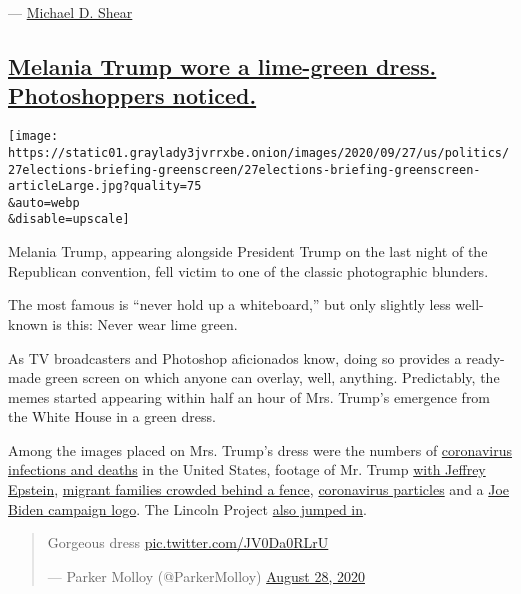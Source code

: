 --- \href{https://www.nytimes3xbfgragh.onion/by/michael-d-shear}{Michael
D. Shear}

\hypertarget{melania-trump-wore-a-lime-green-dress-photoshoppers-noticed}{%
\subsection{\texorpdfstring{\protect\hyperlink{melania-trump-wore-a-lime-green-dress-photoshoppers-noticed}{Melania
Trump wore a lime-green dress. Photoshoppers
noticed.}}{Melania Trump wore a lime-green dress. Photoshoppers noticed.}}\label{melania-trump-wore-a-lime-green-dress-photoshoppers-noticed}}

\texttt{[image: https://static01.graylady3jvrrxbe.onion/images/2020/09/27/us/politics/27elections-briefing-greenscreen/27elections-briefing-greenscreen-articleLarge.jpg?quality=75\\\&auto=webp\\\&disable=upscale]}

Melania Trump, appearing alongside President Trump on the last night of
the Republican convention, fell victim to one of the classic
photographic blunders.

The most famous is ``never hold up a whiteboard,'' but only slightly
less well-known is this: Never wear lime green.

As TV broadcasters and Photoshop aficionados know, doing so provides a
ready-made green screen on which anyone can overlay, well, anything.
Predictably, the memes started appearing within half an hour of Mrs.
Trump's emergence from the White House in a green dress.

Among the images placed on Mrs. Trump's dress were the numbers of
\href{https://twitter.com/ParkerMolloy/status/1299174942882365441}{coronavirus
infections and deaths} in the United States, footage of Mr. Trump
\href{https://twitter.com/TheDailyShow/status/1299177915028996096}{with
Jeffrey Epstein},
\href{https://twitter.com/z3dster/status/1299173873171271681}{migrant
families crowded behind a fence},
\href{https://twitter.com/_sheateher/status/1299181746315902976}{coronavirus
particles} and a
\href{https://twitter.com/z3dster/status/1299186834375872513}{Joe Biden
campaign logo}. The Lincoln Project
\href{https://twitter.com/ProjectLincoln/status/1299186516300832770}{also
jumped in}.

\begin{quote}
Gorgeous dress
\href{https://t.co/JV0Da0RLrU}{pic.twitter.com/JV0Da0RLrU}

--- Parker Molloy (@ParkerMolloy)
\href{https://twitter.com/ParkerMolloy/status/1299174942882365441?ref_src=twsrc\%5Etfw}{August
28, 2020}
\end{quote}


